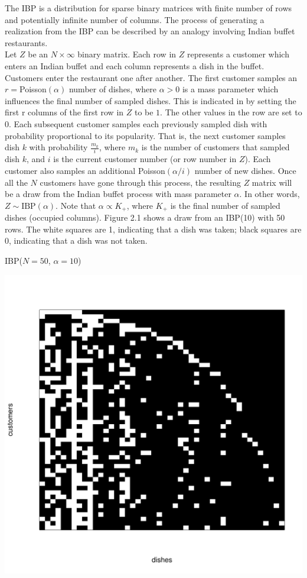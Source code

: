 \noindent
The IBP is a distribution for sparse binary matrices with finite number of rows
and potentially infinite number of columns. The process of generating a
realization from the IBP can be described by an analogy involving Indian buffet
restaurants.\\

\noindent
Let $Z$ be an $N \times \infty$ binary matrix. Each row in $Z$ represents a
customer which enters an Indian buffet and each column represents a dish in the
buffet. Customers enter the restaurant one after another. The first customer
samples an $r=$Poisson$(\alpha)$ number of dishes, where $\alpha > 0$ is a mass
parameter which influences the final number of sampled dishes. This is
indicated in by setting the first r columns of the first row in $Z$ to be $1$.
The other values in the row are set to $0$. Each subsequent customer samples
each previously sampled dish with probability proportional to its popularity.
That is, the next customer samples dish $k$ with probability $\frac{m_k}{i}$,
where $m_k$ is the number of customers that sampled dish $k$, and $i$ is the
current customer number (or row number in $Z$). Each customer also samples an
additional Poisson$(\alpha/i)$ number of new dishes. Once all the $N$ customers
have gone through this process, the resulting $Z$ matrix will be a draw from
the Indian buffet process with mass parameter $\alpha$. In other words, $Z \sim
\text{IBP}(\alpha)$. Note that $\alpha \propto K_+$, where $K_+$ is the final
number of sampled dishes (occupied columns). Figure 2.1 shows a draw from an
IBP(10) with 50 rows. The white squares are 1, indicating that a dish was
taken; black squares are 0, indicating that a dish was not taken. \\
\beginmyfig
  \caption{IBP($N=50$, $\alpha=10$)}
  \includegraphics{images/ibp.pdf}
\endmyfig


